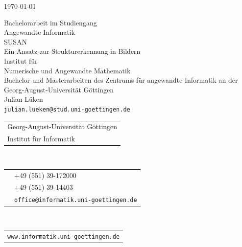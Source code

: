 \documentclass[a4paper, 11pt]{report}
\newcommand{\mytitle}[1]{\LARGE{#1}\normalsize}
\newcommand{\titlespace}{\vspace{2.5em}}
\newcommand{\hugespace}{\vspace{22em}}
\theoremstyle{definition}
\begin{document}
\begin{titlepage}
	\begin{center}
		\begin{minipage}{.49\textwidth}
			\flushleft
			
		\end{minipage}
		\begin{minipage}{.49\textwidth}
			\flushright
			\today\\
			\phantom{1}
		\end{minipage}
		\begin{minipage}{.49\textwidth}
			\begin{center}
				\vspace{2cm}
				Bachelorarbeit im Studiengang\\
				\glqq Angewandte Informatik\grqq{}\\
				\titlespace
				\mytitle{SUSAN}\\
				Ein Ansatz zur Strukturerkennung in Bildern\\
				\hugespace
				Institut für\\Numerische und Angewandte Mathematik\\
				\titlespace
				Bachelor und Masterarbeiten des Zentrums für angewandte Informatik an der Georg-August-Universität Göttingen\\
				\titlespace
				Julian Lüken\\
				\texttt{julian.lueken@stud.uni-goettingen.de}\\
			\end{center}
		\end{minipage}
	\end{center}
\end{titlepage}

\restoregeometry
{}
\pagestyle{empty}
\setcounter{page}{2}

\pagebreak
{}
\noindent
\begin{tabular}{l}
Georg-August-Universität Göttingen\\
Institut für Informatik\\
\end{tabular}\\[1em]
\begin{tabular}{ll}
	\Telefon 	&+49 (551) 39-172000\\
	\FAX 		&+49 (551) 39-14403\\
	\Letter 	&\texttt{office@informatik.uni-goettingen.de}\\
\end{tabular}\\[1em]
\begin{tabular}{l}
\texttt{www.informatik.uni-goettingen.de}\\
\end{tabular}\\[1em]
\end{document}
